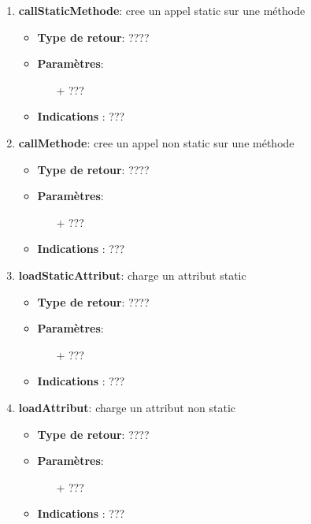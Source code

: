 \documentclass{article}
\begin{document}
  \begin{enumerate}
  \item \textbf{callStaticMethode}: cree un appel static sur une méthode
  \begin{itemize}
    \item \textbf{Type de retour}: ????
    \item \textbf{Paramètres}:
    \begin{enumerate}
      \item[+] ???
    \end{enumerate}
    \item \textbf{Indications} : ??? 
  \end{itemize} 

  \item \textbf{callMethode}: cree un appel non static sur une méthode
  \begin{itemize}
    \item \textbf{Type de retour}: ????
    \item \textbf{Paramètres}:
    \begin{enumerate}
      \item[+] ???
    \end{enumerate}
    \item \textbf{Indications} : ??? 
  \end{itemize}

  \item \textbf{loadStaticAttribut}: charge un attribut static
  \begin{itemize}
    \item \textbf{Type de retour}: ????
    \item \textbf{Paramètres}:
    \begin{enumerate}
      \item[+] ???
    \end{enumerate}
    \item \textbf{Indications} : ??? 
  \end{itemize} 

  \item \textbf{loadAttribut}: charge un attribut non static
  \begin{itemize}
    \item \textbf{Type de retour}: ????
    \item \textbf{Paramètres}:
    \begin{enumerate}
      \item[+] ???
    \end{enumerate}
    \item \textbf{Indications} : ??? 
  \end{itemize} 


  \end{enumerate}
\end{document}
